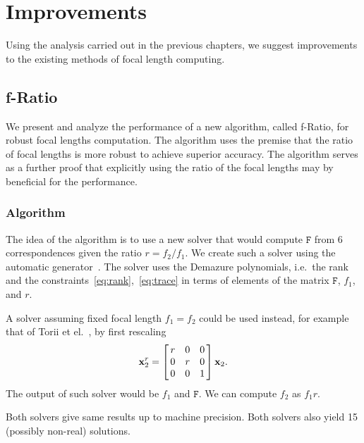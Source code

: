 
\chapter{Improvements}


\label{seq:thenew}

Using the analysis carried out in the previous chapters, we suggest  improvements to the existing methods of focal length computing.

\section{f-Ratio}
We present and analyze the performance of a new algorithm, called f-Ratio, for robust focal lengths computation. The algorithm uses the premise that the ratio of focal lengths is more robust to achieve superior accuracy. The algorithm serves as a further proof that explicitly using the ratio of the focal lengths may by beneficial for the performance.

\subsection{Algorithm}

The idea of the algorithm is to use a new solver that would compute $\mathtt{F}$ from 6 correspondences given the ratio $r=f_2 \slash f_1$. We create such a solver using the automatic generator~\cite{generator}. The solver uses the Demazure polynomials, i.e.\ the rank and the constraints~\ref{eq:rank},~\ref{eq:trace} in terms of elements of the matrix $\mathtt{F}$, $f_1$, and $r$. 

 A solver assuming fixed focal length $f_1=f_2$ could be used instead, for example that of Torii et el.~\cite{Aki6pt}, by first rescaling \[\V{x}_2^{r}= \mat{ccc}{r & 0 & 0 \\ 0 & r & 0 \\ 0 & 0 & 1} \V{x}_2.\] The output of such solver would be $f_1$ and $\mathtt{F}$. We can compute $f_2$ as $f_1  r$.  

Both solvers give same results up to machine precision. Both solvers also yield 15 (possibly non-real) solutions. 

